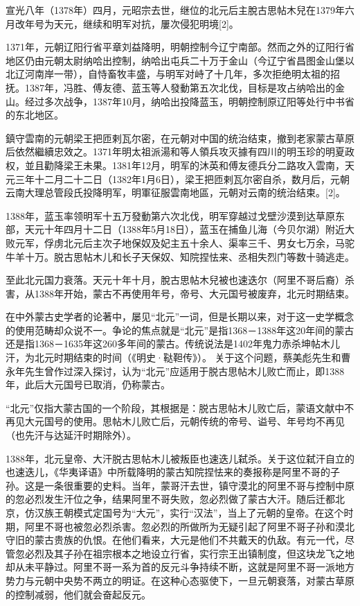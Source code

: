 宣光八年（1378年）四月，元昭宗去世，继位的北元后主脫古思帖木兒在1379年六月改年号为天元，继续和明军对抗，屢次侵犯明境[2]。

1371年，元朝辽阳行省平章刘益降明，明朝控制今辽宁南部。然而之外的辽阳行省地区仍由元朝太尉纳哈出控制，纳哈出屯兵二十万于金山（今辽宁省昌图金山堡以北辽河南岸一带），自恃畜牧丰盛，与明军对峙了十几年，多次拒绝明太祖的招抚。1387年，冯胜、傅友德、蓝玉等人發動第五次北伐，目标是攻占纳哈出的金山。经过多次战争，1387年10月，纳哈出投降蓝玉，明朝控制原辽阳等处行中书省的东北地区。

鎮守雲南的元朝梁王把匝剌瓦尔密，在元朝对中国的统治结束，撤到老家蒙古草原后依然繼續忠效之。1371年明太祖派湯和等人領兵攻灭據有四川的明玉珍的明夏政权，並且勸降梁王未果。1381年12月，明军的沐英和傅友德兵分二路攻入雲南，天元三年十二月二十二日（1382年1月6日），梁王把匝剌瓦尔密自杀，数月后，元朝云南大理总管段氏投降明军，明軍征服雲南地區，元朝对云南的统治结束。[2]。

1388年，蓝玉率领明军十五万發動第六次北伐，明军穿越过戈壁沙漠到达草原东部，天元十年四月十二日（1388年5月18日），蓝玉在捕鱼儿海（今贝尔湖）附近大败元军，俘虏北元后主次子地保奴及妃主五十余人、渠率三千、男女七万余，马驼牛羊十万。脱古思帖木儿和长子天保奴、知院捏怯来、丞相失烈门等数十骑逃走。

至此北元国力衰落。天元十年十月，脫古思帖木兒被也速迭尔（阿里不哥后裔）杀害，从1388年开始，蒙古不再使用年号，帝号、大元国号被废弃，北元时期结束。

在中外蒙古史学者的论著中，屡见“北元”一词，但是长期以来，对于这一史学概念的使用范畴却众说不一。争论的焦点就是“北元”是指1368－1388年这20年间的蒙古还是指1368－1635年这260多年间的蒙古。传统说法是1402年鬼力赤杀坤帖木儿汗，为北元时期结束的时间（《明史·鞑靼传》）。 关于这个问题，蔡美彪先生和曹永年先生曾作过深入探讨，认为“北元”应适用于脱古思帖木儿败亡而止，即1388年，此后大元国号已取消，仍称蒙古。

“北元”仅指大蒙古国的一个阶段，其根据是：脱古思帖木儿败亡后，蒙语文献中不再见大元国号的使用。思帖木儿败亡后，元朝传统的帝号、谥号、年号均不再见（也先汗与达延汗时期除外）。

1388年，北元皇帝、大汗脱古思帖木儿被叛臣也速迭儿弑杀。关于这位弑汗自立的也速迭儿，《华夷译语》中所载降明的蒙古知院捏怯来的奏报称是阿里不哥的子孙。这是一条很重要的史料。当年，蒙哥汗去世，镇守漠北的阿里不哥与控制中原的忽必烈发生汗位之争，结果阿里不哥失败，忽必烈做了蒙古大汗。随后迁都北京，仿汉族王朝模式定国号为“大元”，实行“汉法”，当上了元朝的皇帝。在这个时期，阿里不哥也被忽必烈杀害。忽必烈的所做所为无疑引起了阿里不哥子孙和漠北守旧的蒙古贵族的仇恨。在他们看来，大元是他们不共戴天的仇敌。有元一代，尽管忽必烈及其子孙在祖宗根本之地设立行省，实行宗王出镇制度，但这块龙飞之地却从未平静过。阿里不哥一系为首的反元斗争持续不断，这就是阿里不哥一派地方势力与元朝中央势不两立的明证。在这种心态驱使下，一旦元朝衰落，对蒙古草原的控制减弱，他们就会奋起反元。

